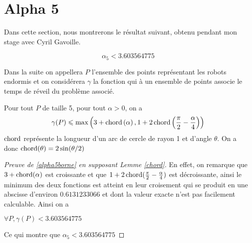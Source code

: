 \section{Alpha 5}

Dans cette section, nous montrerons le résultat suivant, obtenu pendant
  mon stage avec Cyril Gavoille.

\begin{theorem}\label{alpha5borne}

$$\alpha_5 < 3.603564775$$

\end{theorem}

Dans la suite on appellera $P$ l'ensemble des points représentant les robots endormis et on considérera $\gamma$ la fonction qui à un ensemble de points associe le temps de réveil du problème associé.

\begin{lemma}\label{chord}
Pour tout $P$ de taille 5, pour tout $\alpha >0$, on a
$$\gamma(P) \leqslant \max\left(3 + \operatorname{chord}\left(\alpha\right), 1 + 2\operatorname{chord}\left(\frac{\pi}{2} - \frac{\alpha}{4}\right)\right)$$
$\operatorname{chord}$ représente la longueur d'un arc de cercle de rayon 1 et d'angle $\theta$. On a donc $\operatorname{chord}(\theta) = 2\sin(\theta/2)$
\end{lemma}

\begin{proof}[Preuve de \ref{alpha5borne} en supposant Lemme \ref{chord}]

En effet, on remarque que $3+\operatorname{chord}(\alpha)$ est croissante et que $1 + 2\operatorname{chord}(\frac{\pi}{2} - \frac{\alpha}{4})$ est décroissante, ainsi le minimum des deux fonctions est atteint en leur croisement qui se produit en une abscisse d'environ $0.6131233066$ et dont la valeur exacte n'est pas facilement calculable. Ainsi on a

\(\forall P, \gamma(P) < 3.603564775\)

Ce qui montre que $\alpha_5 < 3.603564775$

\end{proof}

